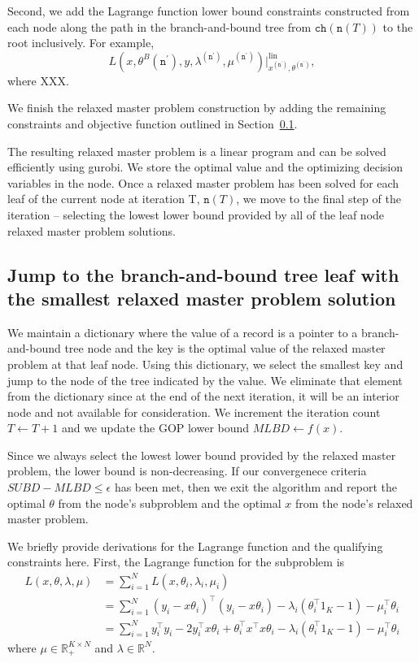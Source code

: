 \documentclass[11pt]{article}
\newcommand{\RR}{\ensuremath{\mathbb{R}}}
\newcommand{\T}{\ensuremath{\top}}
\renewcommand{\leq}{\leqslant}
\newcommand{\node}{\texttt{n}}
\newcommand{\ch}{\texttt{ch}}
\begin{document}
Second, we add the Lagrange function lower bound constraints constructed from each node along the path in the branch-and-bound tree from $\ch(\node(T))$ to the root inclusively.
For example,
\begin{equation*}
L(x,\theta^{B}(\node^\prime), y, \lambda^{(\node^\prime)},\mu^{(\node^\prime)})\big\vert^{\text{lin}}_{x^{(\node^\prime)}, \theta^{(\node^\prime)}},
\end{equation*}
where XXX.

We finish the relaxed master problem construction by adding the remaining constraints and objective function outlined in Section~\ref{}.

The resulting relaxed master problem is a linear program and can be solved efficiently using gurobi.
We store the optimal value and the optimizing decision variables in the node.
Once a relaxed master problem has been solved for each leaf of the current node at iteration T, $\node(T)$, we move to the final step of the iteration -- selecting the lowest lower bound provided by all of the leaf node relaxed master problem solutions.


\subsection{Jump to the branch-and-bound tree leaf with the smallest relaxed master problem solution}

We maintain a dictionary where the value of a record is a pointer to a branch-and-bound tree node and the key is the optimal value of the relaxed master problem at that leaf node.
Using this dictionary, we select the smallest key and jump to the node of the tree indicated by the value.
We eliminate that element from the dictionary since at the end of the next iteration, it will be an interior node and not available for consideration.
We increment the iteration count $T \leftarrow T+1$ and we update the GOP lower bound $MLBD \leftarrow f(x)$.

Since we always select the lowest lower bound provided by the relaxed master problem, the lower bound is non-decreasing.
If our convergenece criteria $SUBD - MLBD \leq \epsilon$ has been met, then we exit the algorithm and report the optimal $\theta$ from the node's subproblem and the optimal $x$ from the node's relaxed master problem.



We briefly provide derivations for the Lagrange function and the qualifying constraints here. 
First, the Lagrange function for the subproblem is 
\begin{equation}\label{eqn:lagrange1}
    \begin{split}
    L(x, \theta, \lambda, \mu) &= \sum_{i=1}^N L(x, \theta_i, \lambda_i, \mu_i)\\
    &= \sum_{i=1}^N (y_i - x \theta_i)^\T (y_i - x\theta_i) - \lambda_i (\theta_i^\T 1_K - 1) - \mu_i^\T \theta_i\\
    &= \sum_{i=1}^N y_i^\T y_i -2 y_i^\T x \theta_i + \theta_i^\T x^\T x \theta_i - \lambda_i (\theta_i^\T 1_K - 1) - \mu_i^\T \theta_i
    \end{split}
\end{equation}
where $\mu \in \RR_+^{K \times N}$ and $\lambda \in \RR^N$.
\end{document}
